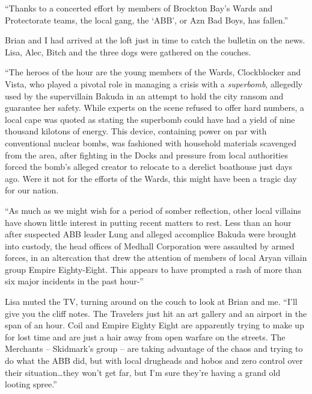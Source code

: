 





``Thanks to a concerted effort by members of Brockton Bay's Wards and Protectorate teams, the local gang, the `ABB', or Azn Bad Boys, has fallen.''



Brian and I had arrived at the loft just in time to catch the bulletin on the news.  Lisa, Alec, Bitch and the three dogs were gathered on the couches.



``The heroes of the hour are the young members of the Wards, Clockblocker and Vista, who played a pivotal role in managing a crisis with a \emph{superbomb}, allegedly used by the supervillain Bakuda in an attempt to hold the city ransom and guarantee her safety.  While experts on the scene refused to offer hard numbers, a local cape was quoted as stating the superbomb could have had a yield of nine thousand kilotons of energy.  This device, containing power on par with conventional nuclear bombs, was fashioned with household materials scavenged from the area, after fighting in the Docks and pressure from local authorities forced the bomb's alleged creator to relocate to a derelict boathouse just days ago.  Were it not for the efforts of the Wards, this might have been a tragic day for our nation.



``As much as we might wish for a period of somber reflection, other local villains have shown little interest in putting recent matters to rest.  Less than an hour after suspected ABB leader Lung and alleged accomplice Bakuda were brought into custody, the head offices of Medhall Corporation were assaulted by armed forces, in an altercation that drew the attention of members of local Aryan villain group Empire Eighty-Eight.  This appears to have prompted a rash of more than six major incidents in the past hour-''



Lisa muted the TV, turning around on the couch to look at Brian and me.  ``I'll give you the cliff notes.  The Travelers just hit an art gallery and an airport in the span of an hour.  Coil and Empire Eighty Eight are apparently trying to make up for lost time and are just a hair away from open warfare on the streets.  The Merchants – Skidmark's group – are taking advantage of the chaos and trying to do what the ABB did, but with local drugheads and hobos and zero control over their situation\ldots they won't get far, but I'm sure they're having a grand old looting spree.''



